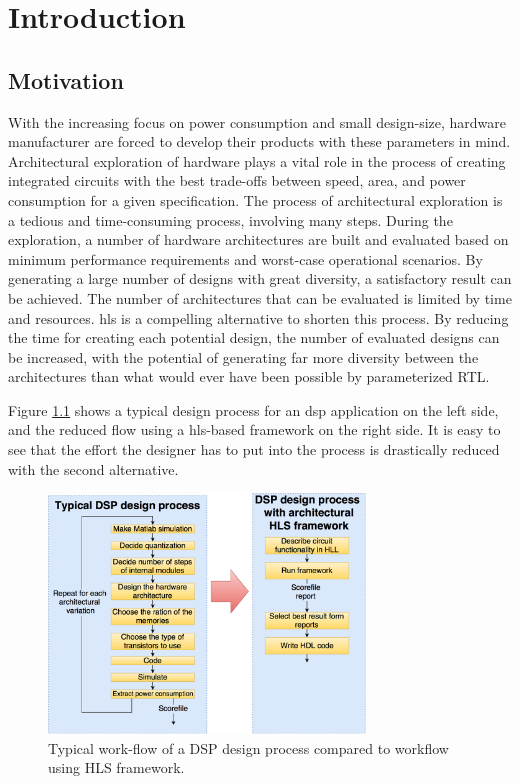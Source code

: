 \chapter{Introduction}
\label{chp:introduction} 
\section{\label{sec:motivation}Motivation}
With the increasing focus on power consumption and small design-size, hardware manufacturer are forced to develop their products with these parameters in mind. Architectural exploration of hardware plays a vital role in the process of creating integrated circuits with the best trade-offs between speed, area, and power consumption for a given specification. The process of architectural exploration is a tedious and time-consuming process, involving many steps. During the exploration, a number of hardware architectures are built and evaluated based on minimum performance requirements and worst-case operational scenarios. By generating a large number of designs with great diversity, a satisfactory result can be achieved. The number of architectures that can be evaluated is limited by time and resources. \gls{hls} is a compelling alternative to shorten this process. By reducing the time for creating each potential design, the number of evaluated designs can be increased, with the potential of generating far more diversity between the architectures than what would ever have been possible by parameterized RTL.

Figure \ref{fig:motivationflow} shows a typical design process for an \gls{dsp} application on the left side, and the reduced flow using a \gls{hls}-based framework on the right side. It is easy to see that the effort the designer has to put into the process is drastically reduced with the second alternative.

\begin{figure}[hbpt]
\centering
\includegraphics[width=0.75\textwidth]{../figs/Motivation.png}
\caption{\label{fig:motivationflow}Typical work-flow of a DSP design process compared to workflow using HLS framework.}
\end{figure}

